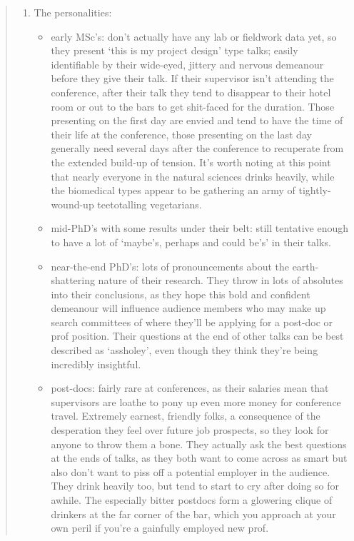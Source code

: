 \documentclass[a4paper]{article}
\begin{document}
\begin{quote}
\begin{enumerate}
\item The personalities:
\begin{itemize}
\item early MSc's: don't actually have any lab or fieldwork data yet, so they
present `this is my project design' type talks; easily identifiable by
their wide-eyed, jittery and nervous demeanour before they give their
talk. If their supervisor isn't attending the conference, after their
talk they tend to disappear to their hotel room or out to the bars
to get shit-faced for the duration. Those presenting on the first day
are envied and tend to have the time of their life at the conference,
those presenting on the last day generally need several days after the
conference to recuperate from the extended build-up of tension. It's worth
noting at this point that nearly everyone in the natural sciences drinks
heavily, while the biomedical types appear to be gathering an army of
tightly-wound-up teetotalling vegetarians.

\item mid-PhD's with some results under their belt: still tentative enough
to have a lot of `maybe's, perhaps and could be's' in their talks.

\item near-the-end PhD's: lots of pronouncements about the earth-shattering
nature of their research. They throw in lots of absolutes into their
conclusions, as they hope this bold and confident demeanour will influence
audience members who may make up search committees of where they'll be
applying for a post-doc or prof position. Their questions at the end of
other talks can be best described as `assholey', even though they think
they're being incredibly insightful.

\item post-docs: fairly rare at conferences, as their salaries mean that
supervisors are loathe to pony up even more money for conference
travel. Extremely earnest, friendly folks, a consequence of the
desperation they feel over future job prospects, so they look for anyone
to throw them a bone. They actually ask the best questions at the ends
of talks, as they both want to come across as smart but also don't want
to piss off a potential employer in the audience. They drink heavily
too, but tend to start to cry after doing so for awhile. The especially
bitter postdocs form a glowering clique of drinkers at the far corner
of the bar, which you approach at your own peril if you're a gainfully
employed new prof.


\end{itemize}
\end{enumerate}
\end{quote}
\end{document}
